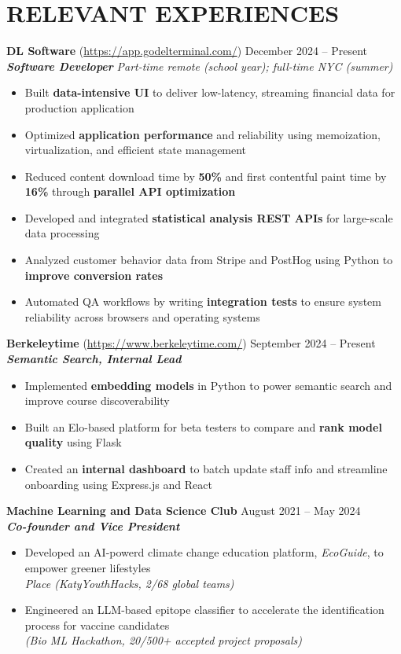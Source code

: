 \section*{RELEVANT EXPERIENCES}

\noindent
\textbf{DL Software} (\href{https://app.godelterminal.com/}{https://app.godelterminal.com/}) \hfill December 2024 -- Present \\
\textbf{\textit{Software Developer}} \hfill \textit{Part-time remote (school year); full-time NYC (summer)}
\begin{itemize}
	\item Built \textbf{data-intensive UI} to deliver low-latency, streaming financial data for production application
	\item Optimized \textbf{application performance} and reliability using memoization, virtualization, and efficient state management
	\item Reduced content download time by \textbf{50\%} and first contentful paint time by \textbf{16\%} through \textbf{parallel API optimization}
	\item Developed and integrated \textbf{statistical analysis REST APIs} for large-scale data processing
	\item Analyzed customer behavior data from Stripe and PostHog using Python to \textbf{improve conversion rates}
	\item Automated QA workflows by writing \textbf{integration tests} to ensure system reliability across browsers and operating systems
\end{itemize}

\noindent
\textbf{Berkeleytime} (\href{https://www.berkeleytime.com/}{https://www.berkeleytime.com/}) \hfill September 2024 -- Present \\
\textbf{\textit{Semantic Search, Internal Lead}}
\begin{itemize}
	\item Implemented \textbf{embedding models} in Python to power semantic search and improve course discoverability
	\item Built an Elo-based platform for beta testers to compare and \textbf{rank model quality} using Flask
	\item Created an \textbf{internal dashboard} to batch update staff info and streamline onboarding using Express.js and React
\end{itemize}

\noindent
\textbf{Machine Learning and Data Science Club} \hfill August 2021 -- May 2024 \\
\textbf{\textit{Co-founder and Vice President}}
\begin{itemize}
	\item Developed an AI-powerd climate change education platform, \textit{EcoGuide}, to empower greener lifestyles \\ \textit{ Place (KatyYouthHacks, 2/68 global teams)}
	\item Engineered an LLM-based epitope classifier to accelerate the identification process for vaccine candidates \\ \textit{(Bio ML Hackathon, 20/500+ accepted project proposals)}
\end{itemize}

